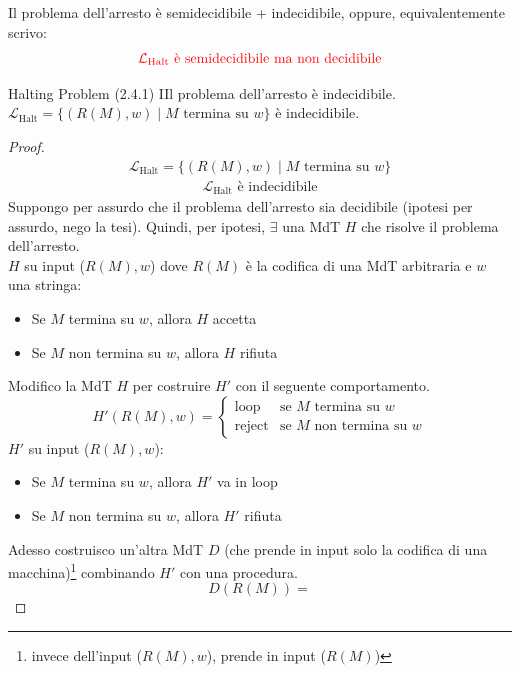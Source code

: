 \documentclass{article}  %
\theoremstyle{definition}
\begin{document}
Il problema dell'arresto è semidecidibile + indecidibile, oppure, equivalentemente scrivo:
\begin{align*}
	\textcolor{red}{\mathcal{L}_{\text{Halt}} \text{ è semidecidibile ma non decidibile}}
\end{align*}

\begin{theorem}{Halting Problem (2.4.1)}
	IIl problema dell'arresto è indecidibile. \\
	$\mathcal{L}_{\text{Halt}} = \{(R(M),w) \mid M \text{ termina su } w\}$ è indecidibile.
	\footnotesize %
	\begin{proof}
		\begin{align*}
			\mathcal{L}_{\text{Halt}} = \{(R(M),w) \mid M \text{ termina su } w\} \tag*{(ipotesi)}
		\end{align*}
		\begin{align*}
			\mathcal{L}_{\text{Halt}} \text{ è indecidibile} \tag*{(tesi)}
		\end{align*}
		Suppongo per assurdo che il problema dell'arresto sia decidibile (ipotesi per assurdo, nego la tesi).
		Quindi, per ipotesi, $\exists$ una MdT $H$ che risolve il problema dell'arresto. \\
		$H$ su input ($R(M),w$) dove $R(M)$ è la codifica di una MdT arbitraria e $w$ una stringa:
		\begin{itemize}
			\item Se $M$ termina su $w$, allora $H$ accetta
			\item Se $M$ non termina su $w$, allora $H$ rifiuta
		\end{itemize}
		Modifico la MdT $H$ per costruire $H'$ con il seguente
		comportamento.
		\[
			H'(R(M),w) =
			\begin{cases}
				\text{loop}   & \text{se } M \text{ termina su } w      \\
				\text{reject} & \text{se } M \text{  non termina su } w
			\end{cases}
		\]
		$H'$ su input ($R(M),w$):
		\begin{itemize}
			\item Se $M$ termina su $w$, allora $H'$ va in loop
			\item Se $M$ non termina su $w$, allora $H'$ rifiuta
		\end{itemize}
		Adesso costruisco un'altra MdT $D$ (che prende in input solo la codifica di una macchina)\footnote{invece dell'input
			($R(M),w$), prende in input ($R(M)$)}
		combinando $H'$ con una procedura.
		\[
			D(R(M)) =
\]
\end{proof}
\end{theorem}
\end{document}
